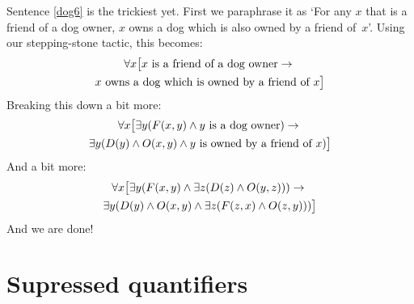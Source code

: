 Sentence \ref{dog6} is the trickiest yet. First we paraphrase it as `For any $x$ that is a friend of a dog owner, $x$ owns a dog which is also owned by a friend of~$x$'. Using our stepping-stone tactic, this becomes:
\begin{multline*}
\forall x\bigl[x\text{ is a friend of a dog owner}\rightarrow {}\\
x\text{ owns a dog which is owned by a friend of }x\bigr]
\end{multline*}
Breaking this down a bit more:
\begin{multline*}
	\forall x\bigl[\exists y(\mathord{F}(x,y) \wedge y\text{ is a dog owner})\rightarrow {}\\
\exists y(\mathord{D}(y) \wedge \mathord{O}(x,y) \wedge y\text{ is owned by a friend of }x)\bigr]
\end{multline*}
And a bit more: 
\begin{multline*}
\forall x\bigl[\exists y(\mathord{F}(x,y) \wedge \exists z(\mathord{D}(z) \wedge \mathord{O}(y,z))) \rightarrow {}\\
\exists y(\mathord{D}(y) \wedge \mathord{O}(x,y) \wedge \exists z(\mathord{F}(z,x) \wedge \mathord{O}(z,y)))\bigr]
\end{multline*}
And we are done!

\section{Supressed quantifiers}\label{ss:SuppQuant}

